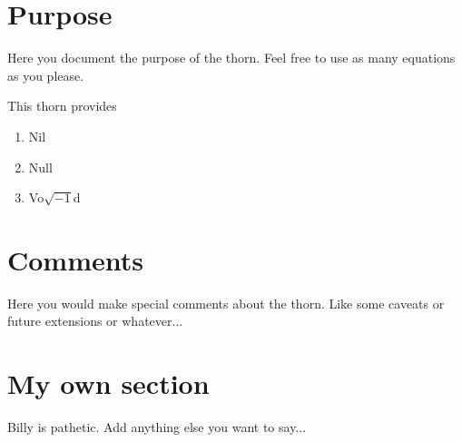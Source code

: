 \documentclass{article}
\begin{document}
\author{Adam Uthor and Barbara Uddy}
\date{1 April 1999}


\section{Purpose}
Here you document the purpose of the thorn. Feel free to use
as many equations as you please.

This thorn provides
 \begin{enumerate}
  \item Nil
  \item Null
  \item Vo$\sqrt{-1}$d
 \end{enumerate}

\section{Comments}
Here you would make special comments about the thorn.  Like some caveats 
or future extensions or whatever...

\section{My own section}
Billy is pathetic. Add anything else you want to say...
\end{document}
